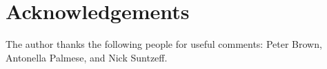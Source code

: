 \section*{Acknowledgements}
The author thanks the following people for useful comments: Peter Brown, Antonella Palmese, and Nick Suntzeff.
{}
% 
